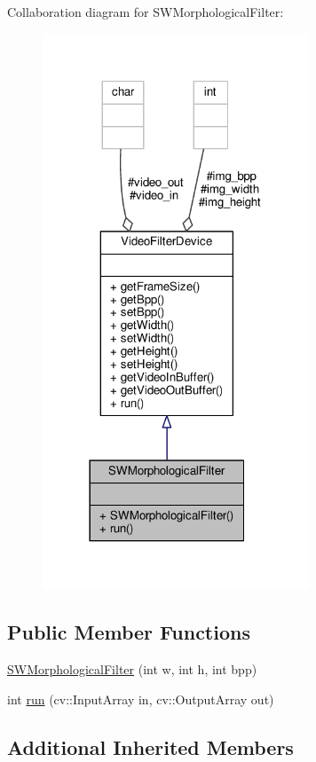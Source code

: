 Collaboration diagram for S\+W\+Morphological\+Filter\+:
\nopagebreak
\begin{figure}[H]
\begin{center}
\leavevmode
\includegraphics[width=225pt]{classSWMorphologicalFilter__coll__graph}
\end{center}
\end{figure}
\subsection*{Public Member Functions}
\begin{DoxyCompactItemize}
\item 
\hyperlink{classSWMorphologicalFilter_a0ac1de93747948924af5ff8bf5b539de}{S\+W\+Morphological\+Filter} (int w, int h, int bpp)
\item 
int \hyperlink{classSWMorphologicalFilter_a6c7ebdba2bbcd4e80aff2c3f2337f972}{run} (cv\+::\+Input\+Array in, cv\+::\+Output\+Array out)
\end{DoxyCompactItemize}
\subsection*{Additional Inherited Members}


